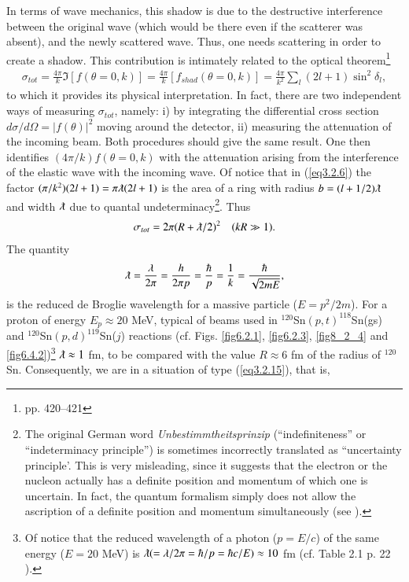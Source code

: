 In terms of wave mechanics, this shadow is due to the destructive interference between the original wave (which would be there even if the scatterer was absent), and the newly scattered wave. Thus, one needs scattering in order to create a shadow. This contribution is intimately related to the optical theorem\footnote{\cite{Sakurai:94} pp. 420--421}
\begin{align}\label{eq3.2.9}
\sigma_{tot}=\frac{4\pi}{k}\Im[f(\theta=0,k)]=\frac{4\pi}{k}[f_{shad}(\theta=0,k)]=\frac{4\pi}{k^2}\sum_l(2l+1)\sin^2\delta_l,
\end{align}
to which it provides its physical interpretation. In fact,  there are two independent ways of measuring $\sigma_{tot}$, namely: i) by integrating the differential cross section $d\sigma/d\Omega=|f(\theta)|^2$ moving around the detector, ii) measuring the attenuation of the incoming beam. Both procedures should give the same result. One then identifies $(4\pi/k)f(\theta=0,k)$ with the attenuation arising from the interference of the elastic wave with the incoming wave. Of notice that in (\ref{eq3.2.6}) the factor $(\pi/k^2)(2l+1)=\pi\lambdabar(2l+1)$ is the area of a ring  with radius $b=(l+1/2)\lambdabar$ and width $\lambdabar$ due to quantal undeterminacy\footnote{The original German word \textit{Unbestimmtheitsprinzip} (``indefiniteness'' or ``indeterminacy principle'') is sometimes incorrectly translated as ``uncertainty principle'. This is very misleading, since it suggests that the electron or the nucleon actually has a definite position and momentum of which one is uncertain. In fact, the quantum formalism simply does not allow the ascription of a definite position and momentum simultaneously (see \cite{Leggett:87}).}. Thus
\begin{align}\label{eq3.2.15}
\sigma_{tot}=2\pi(R+\lambdabar/2)^2\quad(kR\gg1).
\end{align}
The quantity
\begin{align}\label{eq3.2.16}
\lambdabar=\frac{\lambda}{2\pi}=\frac{h}{2\pi p}=\frac{\hbar}{p}=\frac{1}{k}=\frac{\hbar}{\sqrt{2mE}},
\end{align}
is the reduced de Broglie wavelength for a massive particle ($E=p^2/2m$). For a proton of energy $E_p\approx 20$ MeV, typical of beams used in $^{120}$Sn$(p,t)^{118}$Sn(gs) and $^{120}$Sn$(p,d)^{119}$Sn($j$) reactions (cf. Figs. \ref{fig6.2.1}, \ref{fig6.2.3}, \ref{fig8_2_4} and \ref{fig6.4.2})\footnote{Of notice that the reduced wavelength of a photon ($p=E/c$) of the same energy ($E= 20$ MeV) is $\lambdabar (=\lambda/2\pi=\hbar/p=\hbar c/E)\approx 10$ fm (cf. Table 2.1 p. 22 \cite{Satchler:80}).} $\lambdabar\approx 1$ fm, to be compared with the value $R\approx 6$ fm of the radius of $^{120}$Sn. Consequently, we are in a situation of type (\ref{eq3.2.15}), that is,
